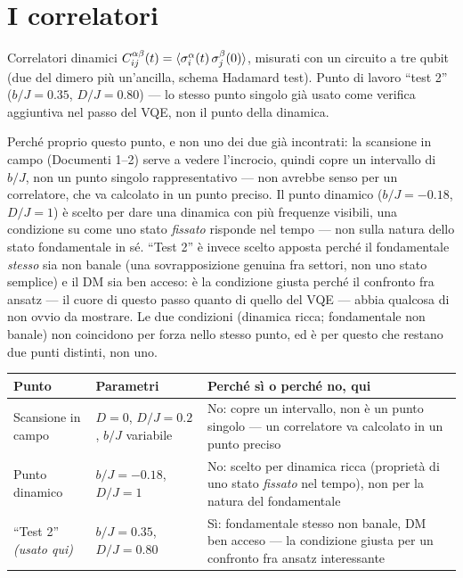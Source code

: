 \documentclass[11pt,a4paper]{article}
\begin{document}

\section{I correlatori}

Correlatori dinamici $C_{ij}^{\alpha\beta}(t)=\langle \sigma_i^\alpha(t)\,
\sigma_j^\beta(0) \rangle$, misurati con un circuito a tre qubit (due del dimero
più un'ancilla, schema Hadamard test). Punto di lavoro ``test 2''
($b/J=0.35$, $D/J=0.80$) --- lo stesso punto singolo già usato come
verifica aggiuntiva nel passo del VQE, non il punto della dinamica.

Perché proprio questo punto, e non uno dei due già incontrati: la
scansione in campo (Documenti 1--2) serve a vedere l'incrocio, quindi
copre un intervallo di $b/J$, non un punto singolo rappresentativo --- non
avrebbe senso per un correlatore, che va calcolato in un punto preciso.
Il punto dinamico ($b/J=-0.18$, $D/J=1$) è scelto per dare una dinamica
con più frequenze visibili, una condizione su come uno stato
\emph{fissato} risponde nel tempo --- non sulla natura dello stato
fondamentale in sé. ``Test 2'' è invece scelto apposta perché il
fondamentale \emph{stesso} sia non banale (una sovrapposizione genuina fra
settori, non uno stato semplice) e il DM sia ben acceso: è la condizione
giusta perché il confronto fra ansatz --- il cuore di questo passo quanto
di quello del VQE --- abbia qualcosa di non ovvio da mostrare. Le due
condizioni (dinamica ricca; fondamentale non banale) non coincidono per
forza nello stesso punto, ed è per questo che restano due punti distinti,
non uno.

\begin{center}
\small
\renewcommand{\arraystretch}{1.35}
\begin{tabular}{@{}p{2.6cm}p{3.2cm}p{7.6cm}@{}}
\toprule
\rowcolor{grigetto}
\textbf{Punto} & \textbf{Parametri} & \textbf{Perché sì o perché no, qui} \\
\midrule
Scansione in campo &
$D=0$, $D/J=0.2$, $b/J$ variabile &
No: copre un intervallo, non è un punto singolo --- un correlatore va
calcolato in un punto preciso \\
Punto dinamico &
$b/J=-0.18$, $D/J=1$ &
No: scelto per dinamica ricca (proprietà di uno stato \emph{fissato} nel
tempo), non per la natura del fondamentale \\
``Test 2'' \textit{(usato qui)} &
$b/J=0.35$, $D/J=0.80$ &
Sì: fondamentale stesso non banale, DM ben acceso --- la condizione
giusta per un confronto fra ansatz interessante \\
\bottomrule
\end{tabular}
\end{center}
\end{document}
